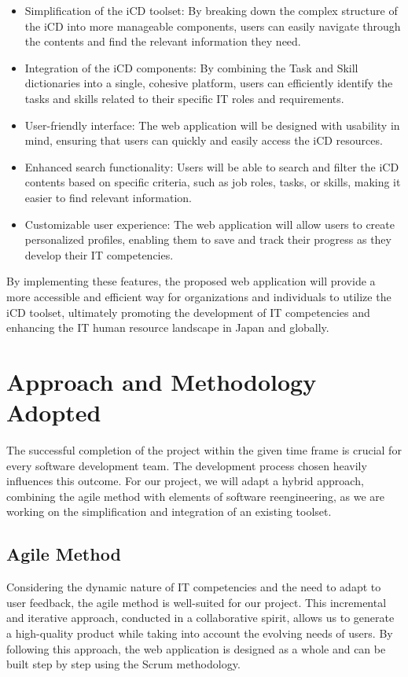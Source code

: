 \begin{itemize}

    \item Simplification of the iCD toolset: By breaking down the complex structure of the iCD into more manageable components, users can easily navigate through the contents and find the relevant information they need.
    \item Integration of the iCD components: By combining the Task and Skill dictionaries into a single, cohesive platform, users can efficiently identify the tasks and skills related to their specific IT roles and requirements.
    \item User-friendly interface: The web application will be designed with usability in mind, ensuring that users can quickly and easily access the iCD resources.
    \item Enhanced search functionality: Users will be able to search and filter the iCD contents based on specific criteria, such as job roles, tasks, or skills, making it easier to find relevant information.
    \item Customizable user experience: The web application will allow users to create personalized profiles, enabling them to save and track their progress as they develop their IT competencies.
          
\end{itemize}
By implementing these features, the proposed web application will provide a more accessible and efficient way for organizations and individuals to utilize the iCD toolset, ultimately promoting the development of IT competencies and enhancing the IT human resource landscape in Japan and globally.




\section{Approach and Methodology Adopted}
The successful completion of the project within the given time frame is crucial for every software development team. The development process chosen heavily influences this outcome. For our project, we will adapt a hybrid approach, combining the agile method with elements of software reengineering, as we are working on the simplification and integration of an existing toolset.

\subsection{Agile Method}
Considering the dynamic nature of IT competencies and the need to adapt to user feedback, the agile method is well-suited for our project. This incremental and iterative approach, conducted in a collaborative spirit, allows us to generate a high-quality product while taking into account the evolving needs of users. By following this approach, the web application is designed as a whole and can be built step by step using the Scrum methodology.


